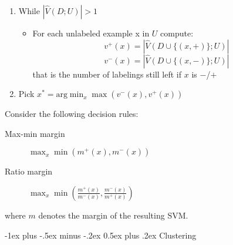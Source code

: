 \documentclass[11pt,landscape]{article}
\makeatletter
\renewcommand{\section}{\@startsection{section}{1}{0mm}%
                                {-1ex plus -.5ex minus -.2ex}%
                                {0.5ex plus .2ex}%
                                {\normalfont\normalsize\bfseries}}
\makeatother
\begin{document}
\begin{multicols}{3}
\begin{description}
\begin{enumerate}
        \item While $|\hat{V}(D;U)| > 1$
            \begin{itemize}
                \item For each unlabeled example x in $U$ compute: 
                $$ v^+(x) = |\hat{V}(D \cup \{(x,+)\}; U)|$$
                $$ v^-(x) = |\hat{V}(D \cup \{(x,-)\}; U)|$$
                that is the number of labelings still left if $x$ is $-$/$+$
            \end{itemize}
        \item Pick $x^{\ast} = \text{arg} \min_{x} \max(v^-(x),v^+(x))$
    \end{enumerate}
    Consider the following decision rules:
    \begin{description}
        \item[Max-min margin] $\max_x \min \left( m^+(x),m^-(x) \right)$
        \item[Ratio margin] $\max_x \min \left (\frac{m^+(x)}{m^-(x)},\frac{m^-(x)}{m^+(x)} \right)$
    \end{description}
    where $m$ denotes the margin of the resulting SVM.
\end{description}

\section{Clustering}

\end{multicols}
\end{document}
